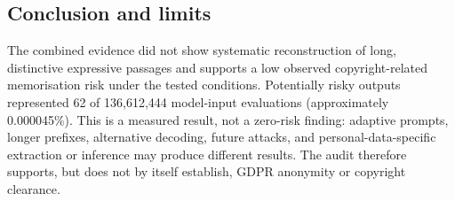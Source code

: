 \documentclass[9pt,a4paper]{article}
\begin{document}
\subsection{Conclusion and limits}
The combined evidence did not show systematic reconstruction of long, distinctive expressive passages and supports a low observed copyright-related memorisation risk under the tested conditions. Potentially risky outputs represented 62 of 136,612,444 model-input evaluations (approximately 0.000045\%). This is a measured result, not a zero-risk finding: adaptive prompts, longer prefixes, alternative decoding, future attacks, and personal-data-specific extraction or inference may produce different results. The audit therefore supports, but does not by itself establish, GDPR anonymity or copyright clearance.
\begin{landscape}

\end{landscape}
\end{document}
